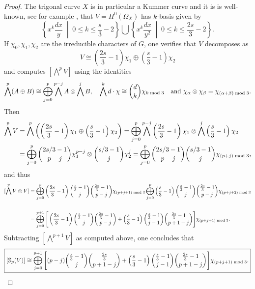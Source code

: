 \documentclass[10pt]{amsart}
\theoremstyle{definition}
\begin{document}
\begin{proof}
The trigonal curve $X$ is in particular a Kummer curve and it is is well-known, see for example \cite[Theorem 8]{KaranProc}, that $V = H^0(\Omega_X)$ has $k$-basis given by
\begin{equation}\label{eq:basis}
\left\{ x^k \frac{dx}{y} \;\middle|\; 0 \le k \le \frac{s}{3} - 2 \right\} 
\bigcup
 \left\{ x^k \frac{dx}{y^2} \;\middle|\; 0 \le k \le \frac{2s}{3} - 2 \right\}.
\end{equation}
If $\chi_0,\chi_1,\chi_2$ are the irreducible characters of $G$, one verifies that $V$ decomposes as
\[
V \cong \left(\frac{2s}{3} - 1\right) \chi_1 \oplus \left(\frac{s}{3} - 1\right) \chi_2
\]
and computes $[\bigwedge^p V]$ using the identities
\begin{equation}\label{eq:identities}
\bigwedge^p (A \oplus B) \cong \bigoplus_{j=0}^p \bigwedge^{p-j} A \otimes \bigwedge^j B,
\quad
\bigwedge^k d\cdot \chi\cong \binom{d}{k}\chi_{k\;{\rm mod}\;3}
\quad
\text{and }
\chi_\alpha\otimes\chi_\beta=\chi_{(\alpha+\beta)\;{\rm mod}\;3}.
\end{equation}
Then
\begin{align*}
\bigwedge^p V&=
\bigwedge^p
\left(
 \left(\frac{2s}{3} - 1\right) \chi_1 \oplus \left(\frac{s}{3} - 1\right) \chi_2
\right) =
\bigoplus_{j=0}^p
\bigwedge^{p-j} \left(\frac{2s}{3} - 1\right) \chi_1
\otimes
\bigwedge^{j} \left(\frac{s}{3} - 1\right) \chi_2\\
&=
\bigoplus_{j=0}^p
\binom{2s/3-1}{p-j}\chi_1^{p-j}\otimes \binom{s/3-1}{j}\chi_2^{j}=
\bigoplus_{j=0}^p
\binom{2s/3-1}{p-j}\binom{s/3-1}{j}\chi_{(p+j)\;{\rm mod}\;3},
\end{align*}
and thus
\begin{align*}
{[\bigwedge^p V \otimes V]} &= 
\bigoplus_{j=0}^p \left(\frac{2s}{3}-1\right) \binom{\frac{s}{3}-1}{j} \binom{\frac{2s}{3}-1}{p-j} \chi_{(p+j+1) \;{\rm mod}\; 3}
\bigoplus_{j=0}^p \left(\frac{s}{3}-1\right) \binom{\frac{s}{3}-1}{j} \binom{\frac{2s}{3}-1}{p-j}\chi_{(p+j+2) \;{\rm mod}\; 3}\\
\\
&=
\bigoplus_{j=0}^{p+1} \Bigg[ 
\left(\frac{2s}{3}-1\right) \binom{\frac{s}{3}-1}{j} \binom{\frac{2s}{3}-1}{p-j} 
+ \left(\frac{s}{3}-1\right) \binom{\frac{s}{3}-1}{j-1} \binom{\frac{2s}{3}-1}{p+1-j} 
\Bigg] \chi_{(p+j+1) \;{\rm mod}\; 3}.
\end{align*}
Subtracting $[\bigwedge^{p+1} V]$ as computed above, one concludes that
\begin{equation*} \label{eq:schur_final}
\boxed{
[\mathbb{S}_p(V)] \cong 
\bigoplus_{j=0}^{p+1} \Bigg[ 
(p-j) \binom{\frac{s}{3}-1}{j} \binom{\frac{2s}{3}}{p+1-j} 
+ \left(\frac{s}{3}-1\right) \binom{\frac{s}{3}-1}{j-1} \binom{\frac{2s}{3}-1}{p+1-j} 
\Bigg] \chi_{(p+j+1) \;{\rm mod}\; 3}.
}
\end{equation*}
\vspace{3mm}


\end{proof}
\end{document}
